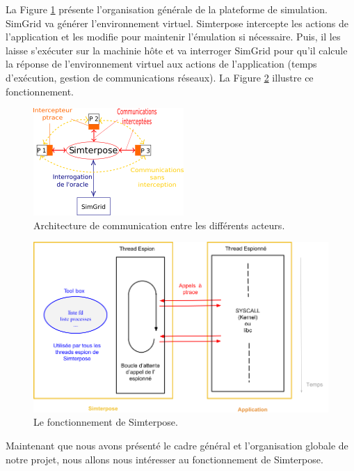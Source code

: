 La Figure \ref{Organisation_generale} présente l'organisation générale de la plateforme de simulation. SimGrid va générer l'environnement virtuel. Simterpose intercepte les
actions de l'application et les modifie pour maintenir l'émulation si
nécessaire. Puis, il les laisse
s'exécuter sur la machinie hôte et va interroger SimGrid pour qu'il calcule la
réponse de l'environnement virtuel aux actions de l'application (temps d'exécution, gestion de communications réseaux). La Figure \ref{Organisation_Simterpose} illustre ce fonctionnement.

\begin{figure}[H]
  \centering
  \includegraphics{Pictures/png/Communications_Simterpose_interprocess_v2}
  \caption{Architecture de communication entre les différents acteurs.}
  \label{Organisation_generale}
\end{figure}

\begin{figure}[H]
  \centering
  \includegraphics[scale=0.5]{Pictures/png/Simterpose_orga_code_v3}
  \caption{Le fonctionnement de Simterpose.}
  \label{Organisation_Simterpose}
\end{figure}

Maintenant que nous avons présenté le cadre général et l'organisation globale
de notre projet, nous allons nous intéresser au fonctionnement de Simterpose.

